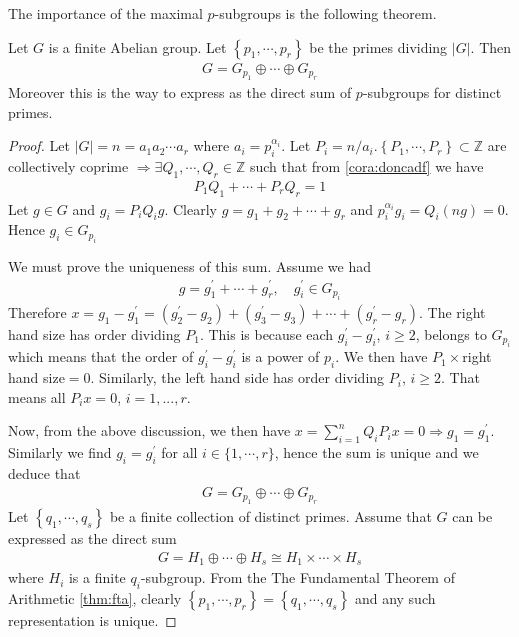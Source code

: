 \documentclass{article}
\begin{document}
The importance of the maximal $p$-subgroups is the following theorem.
\begin{thma}
Let $G$ is a finite Abelian group. Let $\left\{p_{1}, \cdots, p_{r}\right\}$ be the primes dividing $|G|$. Then
\begin{align*}
G=G_{p_{1}} \oplus \cdots \oplus G_{p_{r}}
\end{align*}
Moreover this is the  way to express as the direct sum of $p$-subgroups for distinct primes.
\end{thma}
\begin{proof}
 Let $|G|=n=a_{1} a_{2} \cdots a_{r}$ where $a_{i}=p_{i}^{\alpha_{i}} .$ Let $P_{i}=n / a_{i} .\left\{P_{1}, \cdots, P_{r}\right\} \subset \mathbb{Z}$ are
collectively coprime $\Rightarrow \exists Q_{1}, \cdots, Q_{r} \in \mathbb{Z}$ such that from \cref{cora:doncadf} we have
\begin{align*}
P_{1} Q_{1}+\cdots+P_{r} Q_{r}=1
\end{align*}
Let $g \in G$ and $g_{i}=P_{i} Q_{i} g .$ Clearly $g=g_{1}+g_{2}+\cdots+g_{r}$ and $p_{i}^{\alpha_{i}} g_{i}=Q_{i}(n g)=0$. Hence $g_{i} \in G_{p_{i}}$

We must prove the uniqueness of this sum. Assume we had
\begin{align}
g=g_{1}^{\prime}+\cdots+g_{r}^{\prime}, \quad g_{i}^{\prime} \in G_{p_{i}}\label{eq:omndnla}
\end{align}
Therefore $x=g_{1}-g_{1}^{\prime}=\left(g_{2}^{\prime}-g_{2}\right)+\left(g_{3}^{\prime}-g_{3}\right)+\cdots+\left(g_{r}^{\prime}-g_{r}\right)$. The right hand size has order dividing $P_{1}$. This is because each $g_{i}^{\prime}-g_{i}^{\prime}$, $i\ge 2$, belongs to $G_{p_i}$ which means that the order of $g_{i}^{\prime}-g_{i}^{\prime}$ is a power of $p_i$. We then have $P_1\times$right hand size$=0$. Similarly, the left hand side has order dividing $P_{i}$, $i\ge 2$. That means all $P_ix=0$, $i=1,...,r$.

Now, from the above discussion, we then have $x=\sum_{i=1}^{n} Q_iP_ix=0 \Rightarrow g_{1}=g_{1}^{\prime}$. Similarly we find
$g_{i}=g_{i}^{\prime}$ for all $i \in\{1, \cdots, r\}$, hence the sum is unique and we deduce that 
\begin{align*}
G=G_{p_{1}} \oplus \cdots \oplus G_{p_{r}}
\end{align*}
Let $\left\{q_{1}, \cdots, q_{s}\right\}$ be a finite collection of distinct primes. Assume that $G$ can be expressed as the direct sum
\begin{align*}
G=H_{1} \oplus \cdots \oplus H_{s} \cong H_{1} \times \cdots \times H_{s}
\end{align*}
where $H_{i}$ is a finite $q_{i}$-subgroup. From the The Fundamental Theorem of Arithmetic \cref{thm:fta}, clearly $\left\{p_{1}, \cdots, p_{r}\right\}=\left\{q_{1}, \cdots, q_{s}\right\}$ and any such representation is unique.
\end{proof}
\end{document}
